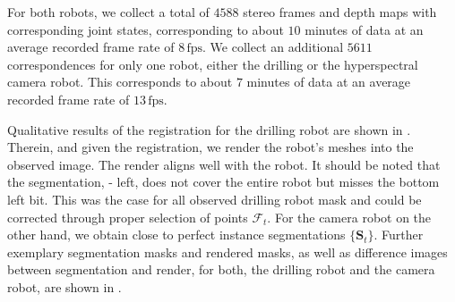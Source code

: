 For both robots, we collect a total of $4588$ stereo frames and depth maps with corresponding joint states, corresponding to about $10$ minutes of data at an average recorded frame rate of $8\,\text{fps}$. We collect an additional $5611$ correspondences for only one robot, either the drilling or the hyperspectral camera robot. This corresponds to about $7$ minutes of data at an average recorded frame rate of $13\,\text{fps}$.

Qualitative results of the registration for the drilling robot are shown in . Therein, and given the registration, we render the robot's meshes into the observed image. The render aligns well with the robot. It should be noted that the segmentation,  - left, does not cover the entire robot but misses the bottom left bit. This was the case for all observed drilling robot mask and could be corrected through proper selection of points $\mathcal{F}_t$. For the camera robot on the other hand, we obtain close to perfect instance segmentations $\{\mathbf{S}_t\}$. Further exemplary segmentation masks and rendered masks, as well as difference images between segmentation and render, for both, the drilling robot and the camera robot, are shown in .
